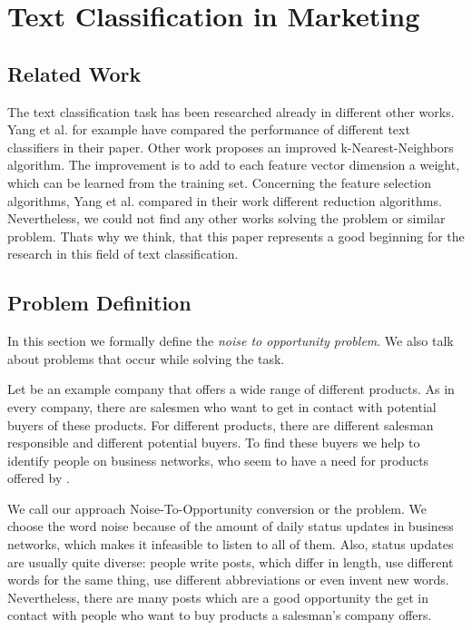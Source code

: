 
\section{Text Classification in Marketing}
\label{sec:background}

\subsection{Related Work}
The text classification task has been researched already in different other works.
Yang et al. for example have compared the performance of different text classifiers in their paper\cite{yang1999re}.
Other work\cite{han2001text} proposes an improved k-Nearest-Neighbors algorithm.
The improvement is to add to each feature vector dimension a weight, which can be learned from the training set.
Concerning the feature selection algorithms, Yang et al. compared in their work\cite{yang1997comparative} different reduction algorithms.
Nevertheless, we could not find any other works solving the \nto problem or similar problem.
Thats why we think, that this paper represents a good beginning for the research in this field of text classification.

\subsection{Problem Definition}
\label{sec:background-problem}

In this section we formally define the \emph{noise to opportunity problem}.
We also talk about problems that occur while solving the task.

Let \acme be an example company that offers a wide range of different products.
As in every company, there are salesmen who want to get in contact with potential buyers of these products.
For different products, there are different salesman responsible and different potential buyers.
To find these buyers we help \acme to identify people on business networks, who seem to have a need for products offered by \acme.

We call our approach Noise-To-Opportunity conversion or the \nto problem.
We choose the word noise because of the amount of daily status updates in business networks, which makes it infeasible to listen to all of them.
Also, status updates are usually quite diverse: people write posts, which differ in length, use different words for the same thing, use  different abbreviations or even invent new words.
Nevertheless, there are many posts which are a good opportunity the get in contact with people who want to buy products a salesman's company offers.

